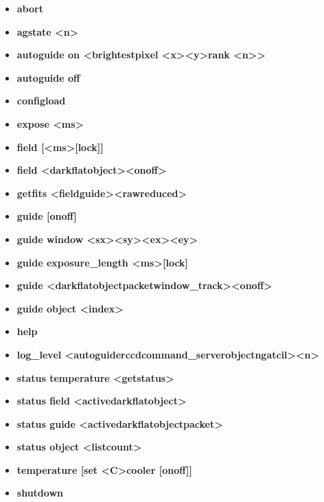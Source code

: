 \documentclass[10pt,a4paper]{article}
\begin{document}
\begin{itemize}
\item {\bf abort}
\item {\bf agstate \textless n\textgreater}
\item {\bf autoguide on \textless brightest\textbar pixel \textless x\textgreater \textless y\textgreater \textbar rank \textless n\textgreater \textgreater }
\item {\bf autoguide off}
\item {\bf configload}
\item {\bf expose \textless ms\textgreater }
\item {\bf field [\textless ms\textgreater  [lock]]}
\item {\bf field \textless dark\textbar flat\textbar object\textgreater  \textless on\textbar off\textgreater }
\item {\bf getfits \textless field\textbar guide\textgreater \textless raw\textbar reduced\textgreater}
\item {\bf guide [on\textbar off]}
\item {\bf guide window \textless sx\textgreater  \textless sy\textgreater  \textless ex\textgreater  \textless ey\textgreater }
\item {\bf guide exposure\_length \textless ms\textgreater  [lock]}
\item {\bf guide \textless dark\textbar flat\textbar object\textbar packet\textbar window\_track\textgreater  \textless on\textbar off\textgreater }
\item {\bf guide object  \textless index\textgreater }
\item {\bf help}
\item {\bf log\_level \textless autoguider\textbar ccd\textbar command\_server\textbar object\textbar ngatcil\textgreater  \textless n\textgreater }
\item {\bf status temperature \textless get\textbar status\textgreater }
\item {\bf status field \textless active\textbar dark\textbar flat\textbar object\textgreater }
\item {\bf status guide \textless active\textbar dark\textbar flat\textbar object\textbar packet\textgreater }
\item {\bf status object \textless list\textbar count\textgreater }
\item {\bf temperature [set \textless C\textgreater \textbar cooler [on\textbar off]]}
\item {\bf shutdown}
\end{itemize}
\end{document}
